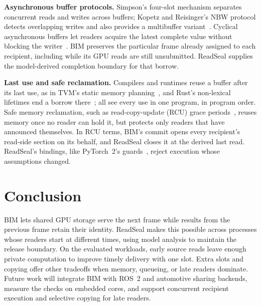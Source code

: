 \documentclass[conference]{IEEEtran}
\newif\ifaidisclosure
\begin{document}
\textbf{Asynchronous buffer protocols.} Simpson's four-slot mechanism separates concurrent reads and writes across buffers; Kopetz and Reisinger's NBW protocol detects overlapping writes and also provides a multibuffer variant~\cite{simpson,nbw,rushbyfour}. Cyclical asynchronous buffers let readers acquire the latest complete value without blocking the writer~\cite{buttazzocab}. BIM preserves the particular frame already assigned to each recipient, including while its GPU reads are still unsubmitted. ReadSeal supplies the model-derived completion boundary for that borrow.

\textbf{Last use and safe reclamation.} Compilers and runtimes reuse a buffer after its last use, as in TVM's static memory planning~\cite{tvm}, and Rust's non-lexical lifetimes end a borrow there~\cite{nll}; all see every use in one program, in program order. Safe memory reclamation, such as read-copy-update (RCU) grace periods~\cite{rcu}, reuses memory once no reader can hold it, but protects only readers that have announced themselves. In RCU terms, BIM's commit opens every recipient's read-side section on its behalf, and ReadSeal closes it at the derived last read. ReadSeal's bindings, like PyTorch~2's guards~\cite{pytorch2}, reject execution whose assumptions changed.

\section{Conclusion}

BIM lets shared GPU storage serve the next frame while results from the previous frame retain their identity. ReadSeal makes this possible across processes whose readers start at different times, using model analysis to maintain the release boundary. On the evaluated workloads, early source reads leave enough private computation to improve timely delivery with one slot. Extra slots and copying offer other tradeoffs when memory, queueing, or late readers dominate. Future work will integrate BIM with ROS~2 and automotive sharing backends, measure the checks on embedded cores, and support concurrent recipient execution and selective copying for late readers.

\ifaidisclosure
\section*{Acknowledgment}
OpenAI Codex assisted with language editing, readability revisions, figure-label updates, evidence cross-checking, and build verification for this revision. Experimental data and figure values are unchanged.
\fi



\end{document}
